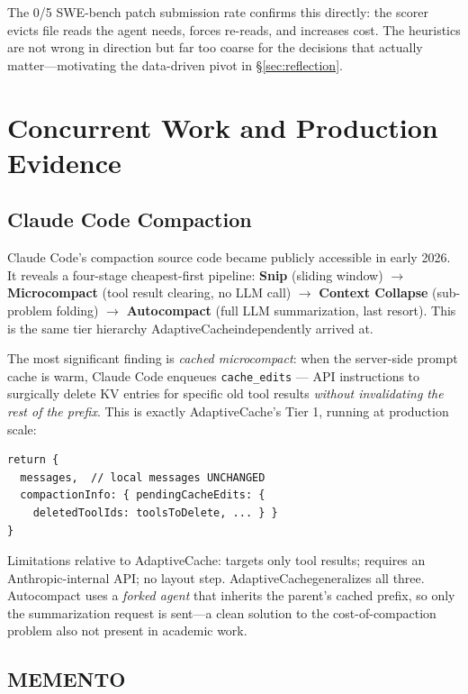 \documentclass[letterpaper,twocolumn,10pt]{article}
\newcommand{\sysname}{AdaptiveCache}
\begin{document}
The 0/5 SWE-bench patch submission rate confirms this directly: the scorer
evicts file reads the agent needs, forces re-reads, and increases cost.
The heuristics are not wrong in direction but far too coarse for the
decisions that actually matter---motivating the data-driven pivot in
\S\ref{sec:reflection}.

\section{Concurrent Work and Production Evidence}
\label{sec:concurrent}

\subsection{Claude Code Compaction~\cite{claudecode2025}}

Claude Code's compaction source code became publicly accessible in early
2026. It reveals a four-stage cheapest-first pipeline:
\textbf{Snip} (sliding window) $\to$
\textbf{Microcompact} (tool result clearing, no LLM call) $\to$
\textbf{Context Collapse} (sub-problem folding) $\to$
\textbf{Autocompact} (full LLM summarization, last resort).
This is the same tier hierarchy \sysname independently arrived at.

The most significant finding is \emph{cached microcompact}: when the
server-side prompt cache is warm, Claude Code enqueues \texttt{cache\_edits}
--- API instructions to surgically delete KV entries for specific old tool
results \emph{without invalidating the rest of the prefix}. This is
exactly \sysname's Tier 1, running at production scale:

\begin{lstlisting}
return {
  messages,  // local messages UNCHANGED
  compactionInfo: { pendingCacheEdits: {
    deletedToolIds: toolsToDelete, ... } }
}
\end{lstlisting}

Limitations relative to \sysname: targets only tool results; requires an
Anthropic-internal API; no layout step. \sysname generalizes all three.
Autocompact uses a \emph{forked agent} that inherits the parent's cached
prefix, so only the summarization request is sent---a clean solution to the
cost-of-compaction problem also not present in academic work.

\subsection{MEMENTO}
\end{document}
